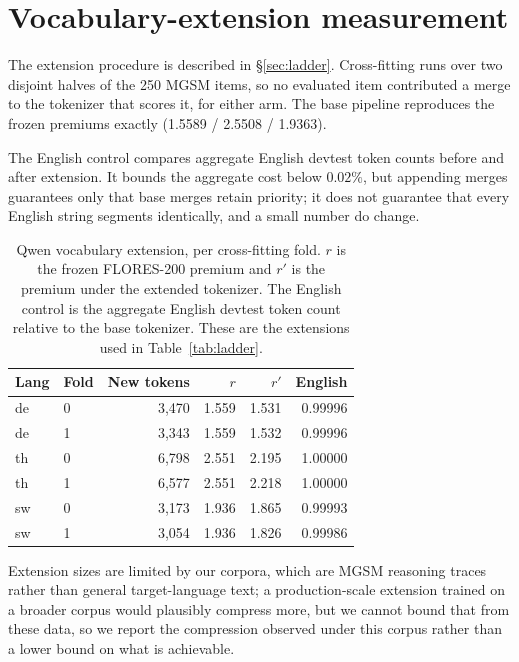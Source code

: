 \documentclass[11pt]{article}
\begin{document}
\section{Vocabulary-extension measurement}
\label{app:vocab}

The extension procedure is described in \S\ref{sec:ladder}. Cross-fitting runs
over two disjoint halves of the 250 MGSM items, so no evaluated item
contributed a merge to the tokenizer that scores it, for either arm. The base
pipeline reproduces the frozen premiums exactly (1.5589 / 2.5508 / 1.9363).

The English control compares aggregate English devtest token counts before and
after extension. It bounds the aggregate cost below \(0.02\%\), but appending
merges guarantees only that base merges retain priority; it does not guarantee
that every English string segments identically, and a small number do change.

\begin{table}[t]
\centering
\small
\caption{Qwen vocabulary extension, per cross-fitting fold. \(r\) is the frozen
FLORES-200 premium and \(r'\) is the premium under the extended tokenizer. The
English control is the aggregate English devtest token count relative to the
base tokenizer. These are the extensions used in Table~\ref{tab:ladder}.}
\label{tab:vocab}
\begin{tabular}{llrrrr}
\toprule
Lang & Fold & New tokens & \(r\) & \(r'\) & English \\
\midrule
de & 0 & 3{,}470 & 1.559 & 1.531 & 0.99996 \\
de & 1 & 3{,}343 & 1.559 & 1.532 & 0.99996 \\
th & 0 & 6{,}798 & 2.551 & 2.195 & 1.00000 \\
th & 1 & 6{,}577 & 2.551 & 2.218 & 1.00000 \\
sw & 0 & 3{,}173 & 1.936 & 1.865 & 0.99993 \\
sw & 1 & 3{,}054 & 1.936 & 1.826 & 0.99986 \\
\bottomrule
\end{tabular}
\end{table}

Extension sizes are limited by our corpora, which are MGSM reasoning traces
rather than general target-language text; a production-scale extension trained
on a broader corpus would plausibly compress more, but we cannot bound that
from these data, so we report the compression observed under this corpus rather
than a lower bound on what is achievable.
\end{document}
